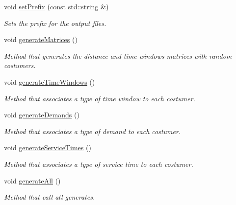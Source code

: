 \begin{DoxyCompactItemize}
void \hyperlink{class_v_r_p_t_w_instance_generator_a2b9026b7a414b1dd3106b606d5c019fd}{setPrefix} (const std::string \&)
\begin{DoxyCompactList}\small\item\em Sets the prefix for the output files. \item\end{DoxyCompactList}\item 
void \hyperlink{class_v_r_p_t_w_instance_generator_a3925a9cfa6d9c9375767bed51b52b0b9}{generateMatrices} ()
\begin{DoxyCompactList}\small\item\em Method that generates the distance and time windows matrices with random costumers. \item\end{DoxyCompactList}\item 
void \hyperlink{class_v_r_p_t_w_instance_generator_a2c5460f0b07ef3a938c0a15d6554699d}{generateTimeWindows} ()
\begin{DoxyCompactList}\small\item\em Method that associates a type of time window to each costumer. \item\end{DoxyCompactList}\item 
void \hyperlink{class_v_r_p_t_w_instance_generator_a28b3de2125c64ceae449289dbb45b9ee}{generateDemands} ()
\begin{DoxyCompactList}\small\item\em Method that associates a type of demand to each costumer. \item\end{DoxyCompactList}\item 
void \hyperlink{class_v_r_p_t_w_instance_generator_a5ebcc45bd6d1ff9086dcc59bc4affe8d}{generateServiceTimes} ()
\begin{DoxyCompactList}\small\item\em Method that associates a type of service time to each costumer. \item\end{DoxyCompactList}\item 
void \hyperlink{class_v_r_p_t_w_instance_generator_adec35b7cd8d0dd12d4b53c03a8953d89}{generateAll} ()
\begin{DoxyCompactList}\small\item\em Method that call all generates. \item\end{DoxyCompactList}\item 

\end{DoxyCompactItemize}
